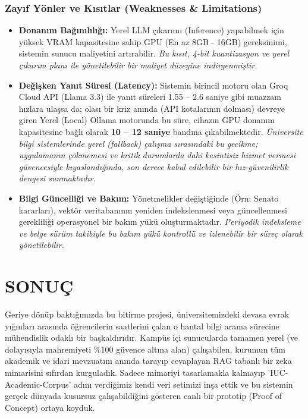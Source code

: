 \documentclass[12pt,a4paper]{report}
\begin{document}
\subsection{Zayıf Yönler ve Kısıtlar (Weaknesses \& Limitations)}
\begin{itemize}
    \item \textbf{Donanım Bağımlılığı:} Yerel LLM çıkarımı (Inference) yapabilmek için yüksek VRAM kapasitesine sahip GPU (En az 8GB - 16GB) gereksinimi, sistemin sunucu maliyetini artırabilir. \textit{Bu kısıt, 4-bit kuantizasyon ve yerel çıkarım planı ile yönetilebilir bir maliyet düzeyine indirgenmiştir.}
   \item \textbf{Değişken Yanıt Süresi (Latency):} Sistemin birincil motoru olan Groq Cloud API (Llama 3.3) ile yanıt süreleri 1.55 -- 2.6 saniye gibi muazzam hızlara ulaşsa da; olası bir kriz anında (API kotalarının dolması) devreye giren Yerel (Local) Ollama motorunda bu süre, cihazın GPU donanım kapasitesine bağlı olarak \textbf{10 -- 12 saniye} bandına çıkabilmektedir. \textit{Üniversite bilgi sistemlerinde yerel (fallback) çalışma sırasındaki bu gecikme; uygulamanın çökmemesi ve kritik durumlarda dahi kesintisiz hizmet vermesi güvencesiyle kıyaslandığında, son derece kabul edilebilir bir hız-güvenilirlik dengesi sunmaktadır.}
    \item \textbf{Bilgi Güncelliği ve Bakım:} Yönetmelikler değiştiğinde (Örn: Senato kararları), vektör veritabanının yeniden indekslenmesi veya güncellenmesi gerekliliği operasyonel bir bakım yükü oluşturmaktadır. \textit{Periyodik indeksleme ve belge sürüm takibiyle bu bakım yükü kontrollü ve izlenebilir bir süreç olarak yönetilebilir.}
\end{itemize}

\chapter{SONUÇ}

Geriye dönüp baktığımızda bu bitirme projesi, üniversitemizdeki devasa evrak yığınları arasında öğrencilerin saatlerini çalan o hantal bilgi arama sürecine mühendislik odaklı bir başkaldırıdır. Kampüs içi sunucularda tamamen yerel (ve dolayısıyla mahremiyeti \%100 güvence altına alan) çalışabilen, kurumun tüm akademik ve idari mevzuatını anında tarayıp cevaplayan RAG tabanlı bir zeka mimarisini sıfırdan kurguladık. Sadece mimariyi tasarlamakla kalmayıp 'IUC-Academic-Corpus' adını verdiğimiz kendi veri setimizi inşa ettik ve bu sistemin gerçek dünyada kusursuz çalışabildiğini gösteren canlı bir prototip (Proof of Concept) ortaya koyduk.
\end{document}
